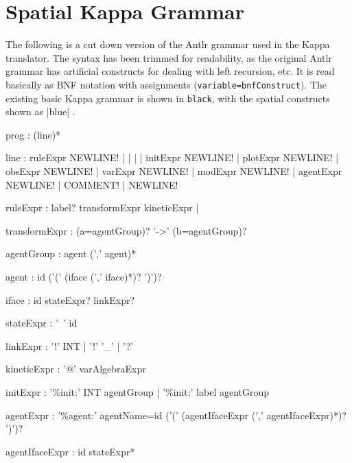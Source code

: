 \chapter{Spatial Kappa Grammar}
\label{chap:spatialGrammar}



The following is a cut down version of the Antlr grammar used in the Kappa translator. The syntax has been trimmed for readability, as the original Antlr grammar has artificial constructs for dealing with left recursion, etc. It is read basically as BNF notation with assignments (\verb|variable=bnfConstruct|). The existing basic Kappa grammar is shown in \verb|black|, with the spatial constructs shown as |blue| . 


\begin{bnfsource}
prog :
  (line)*

line :
  ruleExpr NEWLINE!
  | 
  | 
  | 
  | initExpr NEWLINE!
  | plotExpr NEWLINE!
  | obsExpr NEWLINE!
  | varExpr NEWLINE!
  | modExpr NEWLINE!
  | agentExpr NEWLINE!
  | COMMENT!
  | NEWLINE!

ruleExpr :
  label? transformExpr kineticExpr 
  | 

transformExpr :
  (a=agentGroup)? '->' (b=agentGroup)?

agentGroup :
  agent (',' agent)*

agent :
  id  ('(' (iface (',' iface)*)? ')')?

iface :
  id stateExpr? linkExpr?

stateExpr :
  '~' id

linkExpr :
  '!' INT 
  | '!' '_' 
  | '?'

kineticExpr :
  '@' varAlgebraExpr

initExpr :
  '\%init:' INT  agentGroup
  | '\%init:' label  agentGroup

agentExpr :
  '\%agent:' agentName=id ('(' (agentIfaceExpr (',' agentIfaceExpr)*)? ')')?

agentIfaceExpr :
  id stateExpr*





\end{bnfsource}
